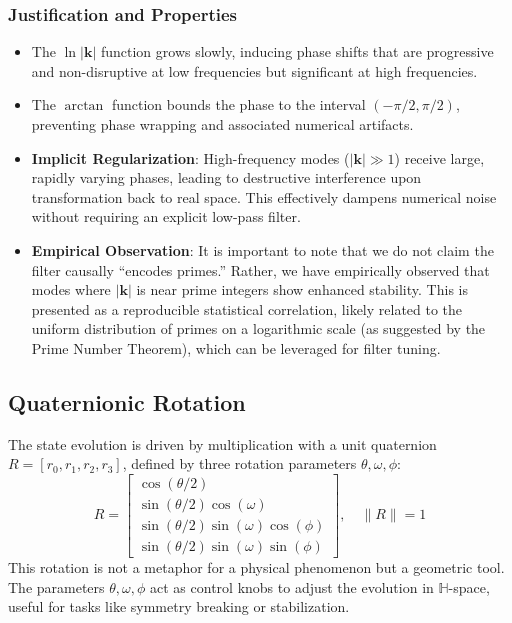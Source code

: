 \documentclass[12pt]{article}
\begin{document}
\subsubsection*{Justification and Properties}
\begin{itemize}
    \item The $ \ln |\mathbf{k}| $ function grows slowly, inducing phase shifts that are progressive and non-disruptive at low frequencies but significant at high frequencies.
    \item The $ \arctan $ function bounds the phase to the interval $ (-\pi/2, \pi/2) $, preventing phase wrapping and associated numerical artifacts.
    \item \textbf{Implicit Regularization}: High-frequency modes ($|\mathbf{k}| \gg 1$) receive large, rapidly varying phases, leading to destructive interference upon transformation back to real space. This effectively dampens numerical noise without requiring an explicit low-pass filter.
    \item \textbf{Empirical Observation}: It is important to note that we do not claim the filter causally “encodes primes.” Rather, we have empirically observed that modes where $|\mathbf{k}|$ is near prime integers show enhanced stability. This is presented as a reproducible statistical correlation, likely related to the uniform distribution of primes on a logarithmic scale (as suggested by the Prime Number Theorem), which can be leveraged for filter tuning.
\end{itemize}

\subsection{Quaternionic Rotation}
The state evolution is driven by multiplication with a unit quaternion $ R = [r_0, r_1, r_2, r_3] $, defined by three rotation parameters $ \theta, \omega, \phi $:
\[
R = \begin{bmatrix} \cos(\theta/2) \\ \sin(\theta/2) \cos(\omega) \\ \sin(\theta/2) \sin(\omega) \cos(\phi) \\ \sin(\theta/2) \sin(\omega) \sin(\phi) \end{bmatrix}, \quad \|R\| = 1
\]
This rotation is not a metaphor for a physical phenomenon but a geometric tool. The parameters $ \theta, \omega, \phi $ act as control knobs to adjust the evolution in $ \mathbb{H} $-space, useful for tasks like symmetry breaking or stabilization.
\end{document}
